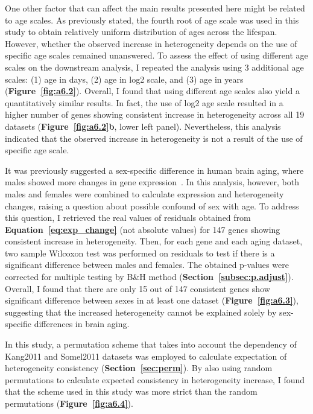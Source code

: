 One other factor that can affect the main results presented here might be related to age scales.
As previously stated, the fourth root of age scale was used in this study to obtain relatively uniform distribution of ages across the lifespan.
However, whether the observed increase in heterogeneity depends on the use of specific age scales remained unanswered.
To assess the effect of using different age scales on the downstream analysis, I repeated the analysis using 3 additional age scales: 
(1) age in days, (2) age in log2 scale, and (3) age in years (\textbf{Figure~\ref{fig:a6.2}}).
Overall, I found that using different age scales also yield a quantitatively similar results.
In fact, the use of log2 age scale resulted in a higher number of genes showing consistent increase in heterogeneity across all 19 datasets (\textbf{Figure~\ref{fig:a6.2}b}, lower left panel).
Nevertheless, this analysis indicated that the observed increase in heterogeneity is not a result of the use of specific age scale.

It was previously suggested a sex-specific difference in human brain aging, where males showed more changes in gene expression~\cite{Berchtold2008}.
In this analysis, however, both males and females were combined to calculate expression and heterogeneity changes, raising a question about possible confound of sex with age.
To address this question, I retrieved the real values of residuals obtained from \textbf{Equation~\ref{eq:exp_change}} 
(not absolute values) for 147 genes showing consistent increase in heterogeneity.
Then, for each gene and each aging dataset, two sample Wilcoxon test was performed on residuals to test if there is a significant difference between males and females.
The obtained p-values were corrected for multiple testing by B{\&}H method (\textbf{Section~\ref{subsec:p.adjust}}).
Overall, I found that there are only 15 out of 147 consistent genes show significant difference between sexes in at least one dataset (\textbf{Figure~\ref{fig:a6.3}}),
suggesting that the increased heterogeneity cannot be explained solely by sex-specific differences in brain aging.

In this study, a permutation scheme that takes into account the dependency of Kang2011 and Somel2011 
datasets was employed to calculate expectation of heterogeneity consistency (\textbf{Section~\ref{sec:perm}}).
By also using random permutations to calculate expected consistency in heterogeneity increase, 
I found that the scheme used in this study was more strict than the random permutations (\textbf{Figure~\ref{fig:a6.4}}).

